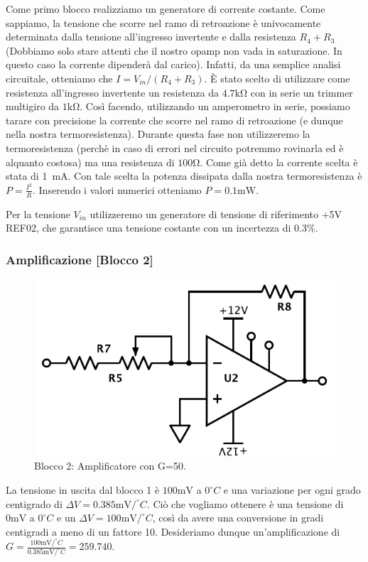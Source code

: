 Come primo blocco realizziamo un generatore di corrente costante. Come sappiamo, la tensione che scorre nel ramo di retroazione è univocamente determinata dalla tensione all'ingresso invertente e dalla resistenza $R_4+R_3$ (Dobbiamo solo stare attenti che il nostro opamp non vada in saturazione. In questo caso la corrente dipenderà dal carico). Infatti, da una semplice analisi circuitale, otteniamo che $I=V_{in}/(R_4+R_3)$. È stato scelto di utilizzare come resistenza all'ingresso invertente un resistenza da $4.7\si{\kilo\ohm}$ con in serie un trimmer multigiro da $1\si{\kilo\ohm}$. Così facendo, utilizzando un amperometro in serie, possiamo tarare con precisione la corrente che scorre nel ramo di retroazione (e dunque nella nostra termoresistenza). Durante questa fase non utilizzeremo la termoresistenza (perchè in caso di errori nel circuito potremmo rovinarla ed è alquanto costosa) ma una resistenza di $100\si{\ohm}$. Come già detto la corrente scelta è stata di \SI{1}{\milli\ampere}. Con tale scelta la potenza dissipata dalla nostra termoresistenza è $P=\frac{I^2}{R}$. Inserendo i valori numerici otteniamo $P=0.1\si{\milli\watt}$.  

Per la tensione $V_{in}$ utilizzeremo un generatore di tensione di riferimento +5\si{\volt} REF02, che garantisce una tensione costante con un incertezza di $0.3\%$.

\subsubsection{Amplificazione [Blocco 2]}

\begin{figure}
\centering
\includegraphics[width=.25\textwidth]{../E06/latex/P2.pdf}
\caption{Blocco 2: Amplificatore con G=50.}
\label{cir5:2wire}
\end{figure}


La tensione in uscita dal blocco 1 è $100 \si{\milli\volt}$ a $0^{\circ}C$ e una variazione per ogni grado centigrado di $\Delta V=0.385\si{\milli\volt}/^{\circ}C$. Ciò che vogliamo ottenere è una tensione di $0 \si{\milli\volt}$ a $0^{\circ}C$ e un $\Delta V=100\si{\milli\volt}/^{\circ}C$, così da avere una conversione in gradi centigradi a meno di un fattore 10. Desideriamo dunque un'amplificazione di $G=\frac{100\si{\milli\volt}/^{\circ}C}{0.385\si{\milli\volt}/^{\circ}C}=259.740$. 


